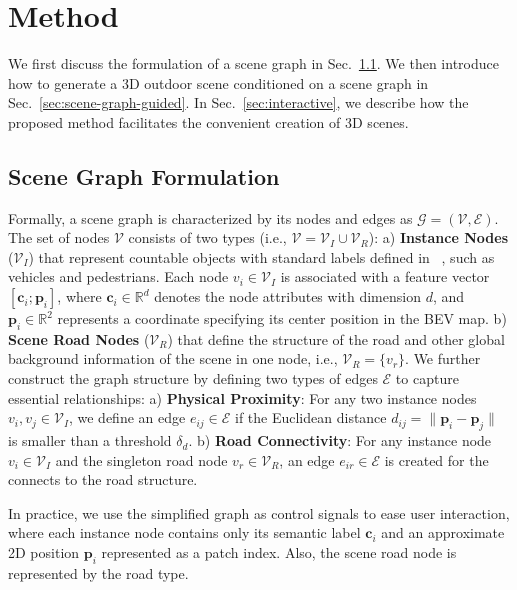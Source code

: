 \section{Method}
\label{sec:approach}

We first discuss the formulation of a scene graph in Sec.~\ref{sec:sg_formulation}. We then introduce how to generate a 3D outdoor scene conditioned on a scene graph in Sec.~\ref{sec:scene-graph-guided}. In Sec.~\ref{sec:interactive}, we describe how the proposed method facilitates the convenient creation of 3D scenes.

\subsection{Scene Graph Formulation}
\label{sec:sg_formulation}
%
Formally, a scene graph is characterized by its nodes and edges as \( \mathcal{G} = (\mathcal{V}, \mathcal{E}) \).
%
The set of nodes \( \mathcal{V} \) consists of two types (i.e., \( \mathcal{V} = \mathcal{V}_I \cup \mathcal{V}_R \)):
a) \textbf{Instance Nodes} (\( \mathcal{V}_I \)) that represent countable objects with standard labels defined in ~\cite{carlasc}, such as vehicles and pedestrians. 
%
Each node \( v_i \in \mathcal{V}_I \) is associated with a feature vector $[\mathbf{c}_i; \mathbf{p}_i]$, where \( \mathbf{c}_i \in \mathbb{R}^d \) denotes the node attributes with dimension $d$, and \( \mathbf{p}_i \in \mathbb{R}^2 \) represents a coordinate specifying its center position in the BEV map. 
%
b) \textbf{Scene Road Nodes} (\( \mathcal{V}_R \)) that define the structure of the road and other global background information of the scene in one node, i.e., $\mathcal{V}_R=\{v_r\}$. 
We further construct the graph structure by defining two types of edges \( \mathcal{E} \) to capture essential relationships: a) \textbf{Physical Proximity}: For any two instance nodes \( v_i, v_j \in \mathcal{V}_I \), we define an edge \( e_{ij} \in \mathcal{E} \) if the Euclidean distance \( d_{ij} = \|\mathbf{p}_i - \mathbf{p}_j\| \)  is smaller than a threshold \( \delta_d \). b) \textbf{Road Connectivity}: For any instance node \( v_i \in \mathcal{V}_I \) and the singleton road node \( v_r \in \mathcal{V}_R \), an edge \( e_{ir} \in \mathcal{E} \) is created for the connects to the road structure. 

In practice, we use the simplified graph as control signals to ease user interaction, where each instance node contains only its semantic label $\mathbf{c}_i$ and an approximate 2D position $\mathbf{p}_i$ represented as a patch index. Also, the scene road node is represented by the road type.



